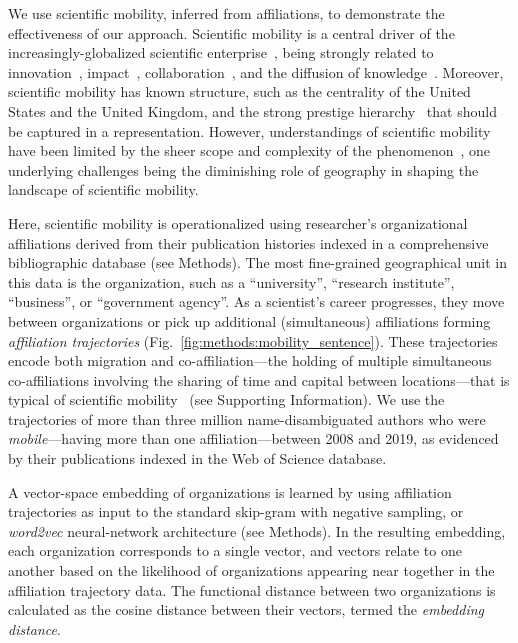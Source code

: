 \documentclass[12pt]{article} %
\def\SI{Supporting Information}
\begin{document}
We use scientific mobility, inferred from affiliations, to demonstrate the effectiveness of our approach.
Scientific mobility is a central driver of the increasingly-globalized scientific enterprise~\autocite{czaika2018globalisation, altbach2004globalization, box2008competition}, being strongly related to innovation~\autocite{braunerhjelm2020labor, kaiser2018innovation, armano2017innovation}, impact~\autocite{sugimoto2017mostimpact, petersen2018multiscale, franzoni2014advantage}, collaboration~\autocite{rodrigues2016mobility}, and the diffusion of knowledge~\autocite{braunerhjelm2020labor, azoulay2011diffusion, morgan2018prestige}.
Moreover, scientific mobility has known structure, such as the centrality of the United States and the United Kingdom, and the strong prestige hierarchy~\autocite{auriol2010careers, clauset2015hierarchy, deville2014career} that should be captured in a representation.
However, understandings of scientific mobility have been limited by the sheer scope and complexity of the phenomenon~\autocite{robinson2019mobility, vannoorden2012mobility, deville2014career, ackers2008mobility, scott2015dynamics}, one underlying challenges being the diminishing role of geography in shaping the landscape of scientific mobility.

Here, scientific mobility is operationalized using researcher's organizational affiliations derived from their publication histories indexed in a comprehensive bibliographic database (see Methods).
The most fine-grained geographical unit in this data is the organization, such as a ``university'', ``research institute'', ``business'', or ``government agency''.
As a scientist's career progresses, they move between organizations or pick up additional (simultaneous) affiliations forming \textit{affiliation trajectories} (Fig.~\ref{fig:methods:mobility_sentence}).
These trajectories encode both migration and co-affiliation---the holding of multiple simultaneous co-affiliations involving the sharing of time and capital between locations---that is typical of scientific mobility~\autocite{rodrigues2016mobility, markova2016synchronous, sugimoto2017mostimpact} (see \SI).
We use the trajectories of more than three million name-disambiguated authors who were \textit{mobile}---having more than one affiliation---between 2008 and 2019, as evidenced by their publications indexed in the Web of Science database.


A vector-space embedding of organizations is learned by using affiliation trajectories as input to the standard skip-gram with negative sampling, or \textit{word2vec} neural-network architecture (see Methods).
In the resulting embedding, each organization corresponds to a single vector, and vectors relate to one another based on the likelihood of organizations appearing near together in the affiliation trajectory data.
The functional distance between two organizations is calculated as the cosine distance between their vectors, termed the \textit{embedding distance}.
\end{document}

